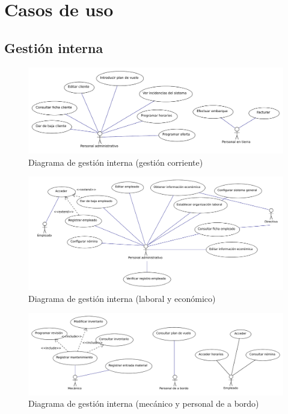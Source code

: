 \documentclass[11pt, a4paper, twoside, titlepage]{article}
\begin{document}
	\section{Casos de uso}
	
	\subsection{Gestión interna} \vspace{.5cm}
	\iniciarnumeraciondiedral

	\ifpdf
	\begin{figure}	%
		\hspace*{0cm}\includegraphics[scale=.9]{diagramas/gicorriente.pdf}
		\caption{Diagrama de gestión interna (gestión corriente)}
	\end{figure}
	\fi

	\ifpdf
	\begin{figure}
		\hspace*{-.4cm}\includegraphics[scale=.82]{diagramas/gilaboral.pdf}
		\caption{Diagrama de gestión interna (laboral y económico)}
	\end{figure}
	\fi

	\ifpdf
	\begin{figure}
		\hspace*{-.2cm}\includegraphics[scale=.82]{diagramas/giespecificos.pdf}
		\caption{Diagrama de gestión interna (mecánico y personal de a bordo)}
	\end{figure}
	\fi
\end{document}
